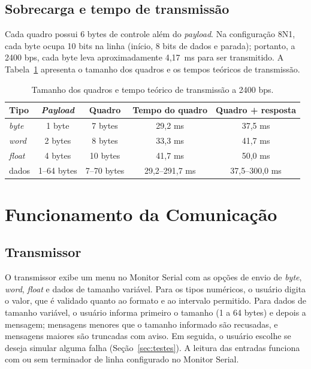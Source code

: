 \documentclass[12pt]{article}
\begin{document}
\subsection{Sobrecarga e tempo de transmissão}

Cada quadro possui 6 bytes de controle além do \emph{payload}. Na configuração 8N1, cada byte ocupa 10 bits na linha (início, 8 bits de dados e parada); portanto, a 2400 bps, cada byte leva aproximadamente 4,17~ms para ser transmitido. A Tabela~\ref{tab:tempos} apresenta o tamanho dos quadros e os tempos teóricos de transmissão.

\begin{table}[!htb]
\centering
\caption{Tamanho dos quadros e tempo teórico de transmissão a 2400 bps.}
\label{tab:tempos}
\small
\begin{tabular}{lcccc}
\toprule
\textbf{Tipo} & \textbf{\emph{Payload}} & \textbf{Quadro} & \textbf{Tempo do quadro} & \textbf{Quadro + resposta} \\
\midrule
\emph{byte} & 1 byte & 7 bytes & 29,2 ms & 37,5 ms \\
\emph{word} & 2 bytes & 8 bytes & 33,3 ms & 41,7 ms \\
\emph{float} & 4 bytes & 10 bytes & 41,7 ms & 50,0 ms \\
dados & 1--64 bytes & 7--70 bytes & 29,2--291,7 ms & 37,5--300,0 ms \\
\bottomrule
\end{tabular}
\end{table}

\section{Funcionamento da Comunicação}
\label{sec:funcionamento}

\subsection{Transmissor}

O transmissor exibe um menu no Monitor Serial com as opções de envio de \emph{byte}, \emph{word}, \emph{float} e dados de tamanho variável. Para os tipos numéricos, o usuário digita o valor, que é validado quanto ao formato e ao intervalo permitido. Para dados de tamanho variável, o usuário informa primeiro o tamanho (1 a 64 bytes) e depois a mensagem; mensagens menores que o tamanho informado são recusadas, e mensagens maiores são truncadas com aviso. Em seguida, o usuário escolhe se deseja simular alguma falha (Seção~\ref{sec:testes}). A leitura das entradas funciona com ou sem terminador de linha configurado no Monitor Serial.
\end{document}

